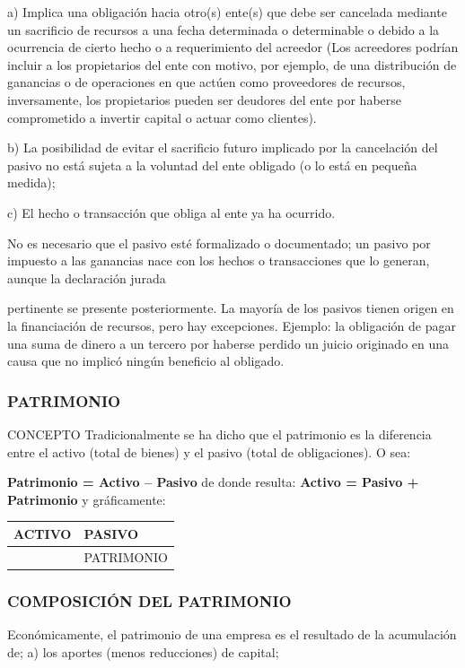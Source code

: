 a) Implica una obligación hacia otro(s) ente(s) que debe ser cancelada mediante un sacrificio de recursos a una fecha determinada o determinable o debido a la ocurrencia de cierto hecho o a requerimiento del acreedor (Los acreedores podrían incluir a los propietarios del ente con motivo, por ejemplo, de una distribución de ganancias o de operaciones en que actúen como proveedores de recursos, inversamente, los propietarios pueden ser deudores del ente por haberse comprometido a invertir capital o actuar como clientes).

b) La posibilidad de evitar el sacrificio futuro implicado por la cancelación del pasivo no está sujeta a la voluntad del ente obligado (o lo está en pequeña medida);

c) El hecho o transacción que obliga al ente ya ha ocurrido.

No es necesario que el pasivo esté formalizado o documentado; un pasivo por impuesto a las ganancias nace con los hechos o transacciones que lo generan, aunque la declaración jurada



pertinente se presente posteriormente. La mayoría de los pasivos tienen origen en la financiación de recursos, pero hay excepciones. Ejemplo: la obligación de pagar una suma de dinero a un tercero por haberse perdido un juicio originado en una causa que no implicó ningún beneficio al obligado.

\subsubsection*{PATRIMONIO}
CONCEPTO Tradicionalmente se ha dicho que el patrimonio es la diferencia entre el activo (total de bienes) y el pasivo (total de obligaciones). O sea:

\textbf{Patrimonio = Activo – Pasivo }de donde resulta: \textbf{Activo = Pasivo + Patrimonio} y gráficamente:


\begin{center}
\small
\begin{tabular}{|p{}|p{}|}
\hline
ACTIVO & PASIVO \\ \hline
 & PATRIMONIO \\ \hline
\end{tabular}
\end{center}

\subsubsection*{COMPOSICIÓN DEL PATRIMONIO}
Económicamente, el patrimonio de una empresa es el resultado de la acumulación de; a) los aportes (menos reducciones) de capital;

